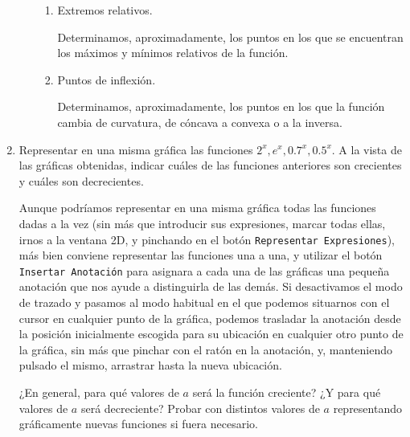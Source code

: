 \begin{enumerate}[leftmargin=*]
\begin{enumerate}
\begin{enumerate}
	      	      	\item Extremos relativos.
	      	      	      \begin{indication}
	      	      	      	Determinamos, aproximadamente, los puntos en los que se encuentran los máximos y mínimos relativos de la función.
	      	      	      \end{indication}
	      	      	      
	      	      	\item Puntos de inflexión.
	      	      	      \begin{indication}
	      	      	      	Determinamos, aproximadamente, los puntos en los que la función cambia de curvatura, de cóncava a convexa o a la inversa.
	      	      	      \end{indication}
	      	      \end{enumerate}
	      \end{enumerate}
	      
	\item Representar en una misma gráfica las funciones $2^{x}, e^{x}, 0.7^{x}, 0.5^{x}$. A la vista de las gráficas obtenidas, indicar cuáles
	      de las funciones anteriores son crecientes y cuáles son decrecientes.
	      \begin{indication}
	      	Aunque podríamos representar en una misma gráfica todas las funciones dadas a la vez  (sin más que introducir sus expresiones, marcar
	      	todas ellas, irnos a la ventana 2D, y pinchando en el botón \texttt{Representar Expresiones}), más bien conviene representar las funciones
	      	una a una, y utilizar el botón \texttt{Insertar Anotación} para asignara a cada una de las gráficas una pequeña anotación que nos ayude a
	      	distinguirla de las demás. Si desactivamos el modo de trazado y pasamos al modo habitual en el que podemos situarnos con el cursor en
	      	cualquier punto de la gráfica, podemos trasladar la anotación desde la posición inicialmente escogida para su ubicación en cualquier otro
	      	punto de la gráfica, sin más que pinchar con el ratón en la anotación, y, manteniendo pulsado el mismo, arrastrar hasta la nueva ubicación.
	      \end{indication}
	      
	      ¿En general, para qué valores de $a$ será la función creciente? ¿Y para qué valores de $a$ será decreciente? Probar con
	      distintos valores de $a$ representando gráficamente nuevas funciones si fuera necesario.
	      

\end{enumerate}
